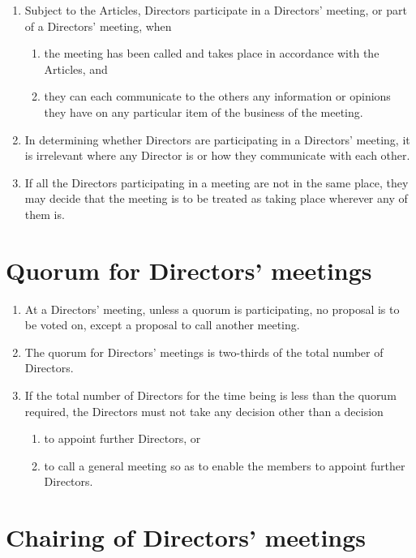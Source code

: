 \documentclass[a4paper,12pt]{article}
\begin{document}
\begin{enumerate}
  \item Subject to the Articles, Directors participate in a Directors' meeting, or part of a Directors' meeting, when
  \begin{enumerate}
    \item the meeting has been called and takes place in accordance with the Articles, and
    \item they can each communicate to the others any information or opinions they have on any particular item of the business of the meeting.
  \end{enumerate}
  \item In determining whether Directors are participating in a Directors' meeting, it is irrelevant where any Director is or how they communicate with each other.
  \item If all the Directors participating in a meeting are not in the same place, they may decide that the meeting is to be treated as taking place wherever any of them is.
\end{enumerate}

\section{Quorum for Directors' meetings}

\begin{enumerate}
  \item At a Directors' meeting, unless a quorum is participating, no proposal is to be voted on, except a proposal to call another meeting.
  \item The quorum for Directors' meetings is two-thirds of the total number of Directors. %
  \item If the total number of Directors for the time being is less than the quorum required, the Directors must not take any decision other than a decision
  \begin{enumerate}
    \item to appoint further Directors, or
    \item to call a general meeting so as to enable the members to appoint further Directors.
  \end{enumerate}
\end{enumerate}

\section{Chairing of Directors' meetings}
\end{document}
